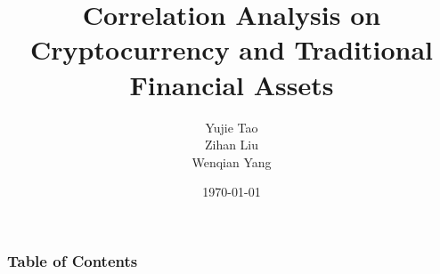 \documentclass{beamer}
\title{Correlation Analysis on Cryptocurrency and Traditional Financial Assets}
\author{Yujie Tao
\\Zihan Liu
\\Wenqian Yang}
\institute{IT Skills for Research}
\date{\today}
\begin{document}


\frame{\titlepage}

\begin{frame}
\frametitle{Table of Contents}
\tableofcontents
\end{frame}






% 


% 


% 
\end{document}
